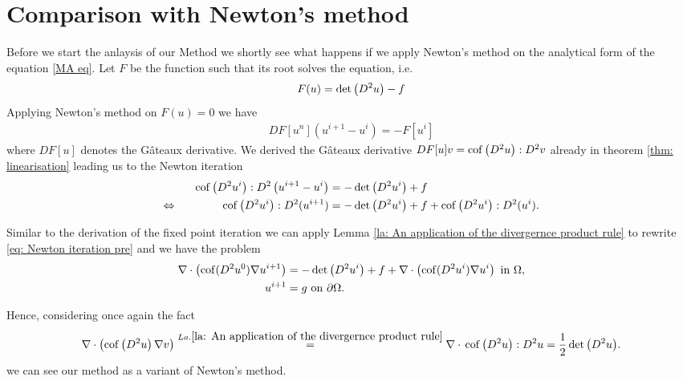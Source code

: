 \section{Comparison with Newton's method}

Before we start the anlaysis of our Method we shortly see what happens if we apply Newton's method on the analytical form of the \MA equation \ref{MA eq}.
Let $F$ be the function such that its root solves the \MA equation, i.e. 
\[
	F(u) = \det{\left(D^2 u\right)} -f
\]
Applying Newton's method on $F(u) =0$ we have
\begin{align}
	DF[u^n](u^{i+1}-u^i) = -F[u^i]
\end{align}
where $DF[u]$ denotes the G\^ateaux derivative. We derived the G\^ateaux derivative $DF[u] v = \operatorname{cof} \left( D^2 u \right):D^2v$ already in theorem \ref{thm: linearisation} leading us to the Newton iteration
\begin{align}
	\operatorname{cof} \left( D^2 u^i \right):D^2\left(u^{i+1}-u^i\right) &= -\det{\left(D^2 u^i\right)}+f \nonumber \\
	\Leftrightarrow \qquad \qquad  \operatorname{cof} \left( D^2 u^i \right):D^2(u^{i+1}) &= -\det{\left(D^2 u^i\right)} +f  +\operatorname{cof} \left( D^2 u^i \right):D^2(u^i). \label{eq: Newton iteration pre}
\end{align}

Similar to the derivation of the fixed point iteration we can apply Lemma \ref{la: An application of the divergernce product rule} to rewrite \eqref{eq: Newton iteration pre} and we have the problem
\begin{align}
	\nabla \cdot \left( \operatorname{cof}(D^2 u^0) \nabla u^{i+1} \right) &= -\det{\left(D^2u^i\right)} +f+\nabla \cdot \left( \operatorname{cof}(D^2 u^i) \nabla u^{i} \right)  \textnormal{ in } \Omega,  \label{eq: Newton iteration}\\
	u^{i+1} &= g \textnormal{ on } \partial \Omega .
\end{align}

Hence, considering once again the fact 
\[
\nabla \cdot \left( \operatorname{cof} \left( D^2 u  \right) \nabla v \right)
\stackrel{La.\ref{la: An application of the divergernce product rule}}=\nabla \cdot {}\operatorname{cof} \left( D^2 u \right):D^2u
=\frac 1 2 \det{\left(D^2u\right)}.
\]
we can see our method as a variant of Newton's method. 

